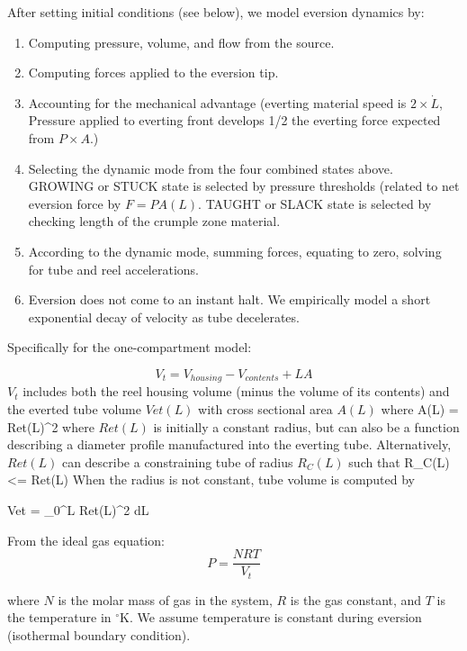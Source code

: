 \documentclass[letterpaper]{article}
\begin{document}
After setting initial conditions (see below), we model eversion dynamics by:
\begin{enumerate}
  \item Computing pressure, volume, and flow from the source.
  \item Computing forces applied to the eversion tip.
  \item Accounting for the mechanical advantage (everting material speed is $2\times\dot{L}$, Pressure applied to everting front develops 1/2 the everting force expected from $P\times A$.)

  \item Selecting the dynamic mode from the four combined states above.
  GROWING or STUCK state is selected by pressure thresholds (related to net
  eversion force by $F=PA(L)$.
  TAUGHT or SLACK state is selected by checking length of
  the crumple zone material.

  \item According to the dynamic mode, summing forces, equating to  zero, solving for tube and reel accelerations.

  \item Eversion does not come to an instant halt. We  empirically model a short exponential decay of velocity as tube decelerates.
\end{enumerate}

\noindent
Specifically for the one-compartment model:

\begin{equation}\label{eqOneCompartmentVol}
V_t = V_{housing} - V_{contents} + L  A
\end{equation}
$V_t$ includes both the reel housing volume (minus the volume of its contents)
and the everted tube volume $Vet(L)$ with cross sectional area $A(L)$
where
\beq
A(L) = \pi Ret(L)^2
\eeq
where $Ret(L)$ is initially a constant radius, but can also
be a function describing a diameter profile manufactured into the
everting tube. Alternatively, $Ret(L)$ can describe a constraining
tube of radius $R_C(L)$ such that
\beq
R_C(L) <= Ret(L)
\eeq
When the radius is not constant, tube volume is computed by

\beq
Vet = \pi \int_0^L Ret(L)^2 dL
\eeq

From the ideal gas equation:
\begin{equation}\label{eqOneCompartmentPress}
P = \frac{N  RT}{ V_t}
\end{equation}

where $N$ is the molar mass of gas in the system, $R$ is the gas constant, and $T$ is the temperature
in $^\circ$K.  We assume temperature is constant during eversion (isothermal boundary condition).
\end{document}
